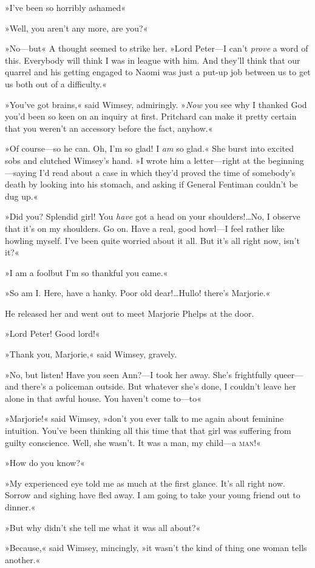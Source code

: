 »I've been so horribly ashamed\longdash«

»Well, you aren't any more, are you?«

»No—but\longdash« A thought seemed to strike her. »Lord Peter—I can't \textit{prove} a word of this. Everybody will think I was in league with him. And they'll think that our quarrel and his getting engaged to Naomi was just a put-up job between us to get us both out of a difficulty.«

»You've got brains,« said Wimsey, admiringly. »\textit{Now} you see why I thanked God you'd been so keen on an inquiry at first. Pritchard can make it pretty certain that you weren't an accessory before the fact, anyhow.«

»Of course—so he can. Oh, I'm so glad! I \textit{am} so glad.« She burst into excited sobs and clutched Wimsey's hand. »I wrote him a letter—right at the beginning—saying I'd read about a case in which they'd proved the time of somebody's death by looking into his stomach, and asking if General Fentiman couldn't be dug up.«

»Did you? Splendid girl! You \textit{have} got a head on your shoulders!\dots No, I observe that it's on my shoulders. Go on. Have a real, good howl—I feel rather like howling myself. I've been quite worried about it all. But it's all right now, isn't it?«

»I am a fool\textellipsis  but I'm so thankful you came.«

»So am I. Here, have a hanky. Poor old dear!\dots Hullo! there's Marjorie.«

He released her and went out to meet Marjorie Phelps at the door.

»Lord Peter! Good lord!«

»Thank you, Marjorie,« said Wimsey, gravely.

»No, but listen! Have you seen Ann?—I took her away. She's frightfully queer—and there's a policeman outside. But whatever she's done, I couldn't leave her alone in that awful house. You haven't come to—to\longdash«

»Marjorie!« said Wimsey, »don't you ever talk to me again about feminine intuition. You've been thinking all this time that that girl was suffering from guilty conscience. Well, she wasn't. It was a man, my child—a \textsc{man}!«

»How do you know?«

»My experienced eye told me as much at the first glance. It's all right now. Sorrow and sighing have fled away. I am going to take your young friend out to dinner.«

»But why didn't she tell me what it was all about?«

»Because,« said Wimsey, mincingly, »it wasn't the kind of thing one woman tells another.«